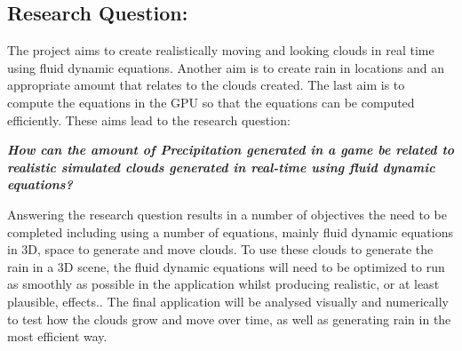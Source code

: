 \subsection{Research Question:}
\label{sec:rq}
The project aims to create realistically moving and looking clouds in real time using fluid dynamic equations.
Another aim is to create rain in locations and an appropriate amount that relates to the clouds created.
The last aim is to compute the equations in the GPU so that the equations can be computed efficiently.
These aims lead to the research question:

\textit{\textbf{How can the amount of Precipitation generated in a game be related to realistic simulated clouds generated in real-time using fluid dynamic equations?}}

Answering the research question results in a number of objectives the need to be completed including using a number of equations, mainly fluid dynamic equations in 3D, space to generate and move clouds.
To use these clouds to generate the rain in a 3D scene, the fluid dynamic equations will need to be optimized to run as smoothly as possible in the application whilst producing realistic, or at least plausible, effects..
The final application will be analysed visually and numerically to test how the clouds grow and move over time, as well as generating rain in the most efficient way.